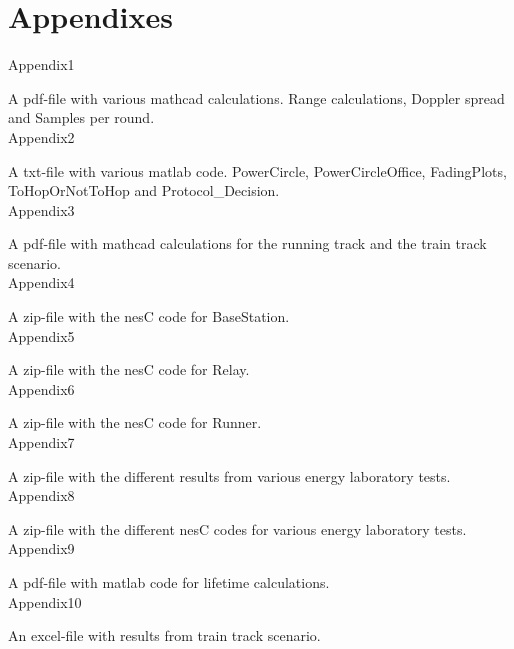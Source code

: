 
 \label{sc:bibliography}

\section*{Appendixes}
\noindent Appendix1

A pdf-file with various mathcad calculations. Range calculations, Doppler spread and Samples per round.\\

\noindent Appendix2

A txt-file with various matlab code. PowerCircle, PowerCircleOffice, FadingPlots, ToHopOrNotToHop and Protocol\_Decision.\\

\noindent Appendix3

A pdf-file with mathcad calculations for the running track and the train track scenario.\\

\noindent Appendix4

A zip-file with the nesC code for BaseStation.\\

\noindent Appendix5

A zip-file with the nesC code for Relay.\\

\noindent Appendix6

A zip-file with the nesC code for Runner.\\

\noindent Appendix7

A zip-file with the different results from various energy laboratory tests.\\

\noindent Appendix8

A zip-file with the different nesC codes for various energy laboratory tests.\\

\noindent Appendix9

A pdf-file with matlab code for lifetime calculations.\\

\noindent Appendix10

An excel-file with results from train track scenario.\\
